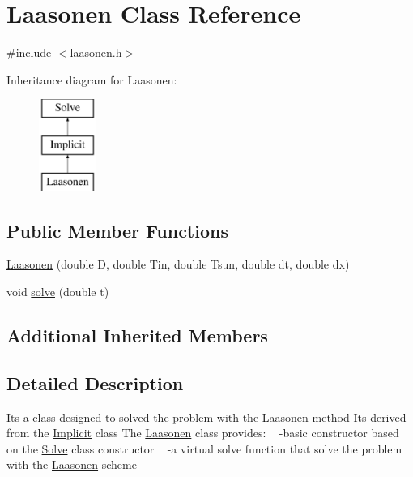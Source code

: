 \hypertarget{class_laasonen}{}\section{Laasonen Class Reference}
\label{class_laasonen}


{\ttfamily \#include $<$laasonen.\+h$>$}

Inheritance diagram for Laasonen\+:\begin{figure}[H]
\begin{center}
\leavevmode
\includegraphics[height=3.000000cm]{class_laasonen}
\end{center}
\end{figure}
\subsection*{Public Member Functions}
\begin{DoxyCompactItemize}
\item 
\hyperlink{class_laasonen_ad20d5e371558ef7c4f04f730daef0049}{Laasonen} (double D, double Tin, double Tsun, double dt, double dx)
\item 
void \hyperlink{class_laasonen_aaa49ab7d15fbfef94a57a0e89977d1c6}{solve} (double t)
\end{DoxyCompactItemize}
\subsection*{Additional Inherited Members}


\subsection{Detailed Description}
It\textquotesingle{}s a class designed to solved the problem with the \hyperlink{class_laasonen}{Laasonen} method It\textquotesingle{}s derived from the \hyperlink{class_implicit}{Implicit} class The \hyperlink{class_laasonen}{Laasonen} class provides\+: ~\newline
-\/basic constructor based on the \hyperlink{class_solve}{Solve} class constructor ~\newline
-\/a virtual solve function that solve the problem with the \hyperlink{class_laasonen}{Laasonen} scheme 


